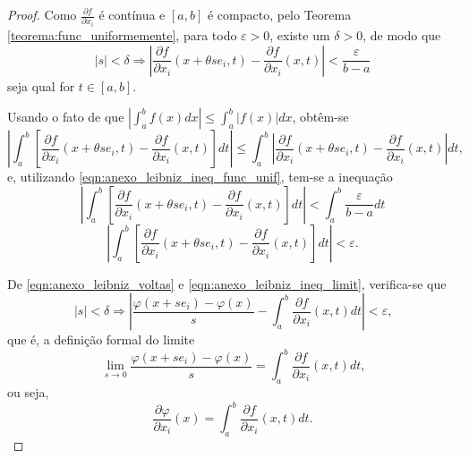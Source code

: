 \begin{apendicesenv}
{\begin{teorema}
\begin{proof}
			Como $\frac{\partial f}{\partial x_i}$ é contínua e $[a,b]$ é compacto, pelo Teorema \ref{teorema:func_uniformemente}, para todo $\varepsilon > 0$, existe um $\delta > 0$, de modo que
			\begin{equation}
				\label{eqn:anexo_leibniz_ineq_func_unif}
				|s|<\delta \Longrightarrow
				\left | 
					\frac{\partial f}{\partial x_i} (x+\theta s e_i, t) - \frac{\partial f}{\partial x_i}(x,t)
				\right | < \frac{\varepsilon}{b-a}
			\end{equation}
			seja qual for $t \in [a,b]$.
			
			Usando o fato de que $|\int_a^b f(x)dx| \leqslant \int_a^b |f(x)| dx$, obtêm-se
			$$
			\left |
				\int_a^b \left [
					\frac{\partial f}{\partial x_i}(x+\theta s e_i, t)-\frac{\partial f}{\partial x_i}(x,t)
				\right ] dt
			\right |
			\leqslant
			\int_a^b\left |
				\frac{\partial f}{\partial x_i}(x+\theta s e_i, t)-\frac{\partial f}{\partial x_i}(x,t)
			\right | dt\text{,}
			$$
			e, utilizando \eqref{eqn:anexo_leibniz_ineq_func_unif}, tem-se a inequação
			$$
			\left |
				\int_a^b \left [
					\frac{\partial f}{\partial x_i}(x+\theta s e_i, t)-\frac{\partial f}{\partial x_i}(x,t)
				\right ] dt
			\right |
			<
			\int_a^b \frac{\varepsilon}{b-a} dt
			$$
			\begin{equation}
				\label{eqn:anexo_leibniz_ineq_limit}
				\left |
					\int_a^b \left [
						\frac{\partial f}{\partial x_i}(x+\theta s e_i, t)-\frac{\partial f}{\partial x_i}(x,t)
					\right ] dt
				\right |
				< \varepsilon \text{.}
			\end{equation}
			
			De \eqref{eqn:anexo_leibniz_voltas} e \eqref{eqn:anexo_leibniz_ineq_limit}, verifica-se que
			$$
				|s|<\delta \Longrightarrow
				\left |
					\frac{\varphi(x+se_i)-\varphi(x)}{s}
					- \int_a^b \frac{\partial f}{\partial x_i}(x,t) dt
				\right |
				< \varepsilon\text{,}
			$$
			que é, a definição formal do limite
			$$
				 \lim_{s\to 0} \frac{\varphi (x+se_i)-\varphi(x)}{s}= \int_a^b \frac{\partial f}{\partial x_i} (x, t)dt \text{,}
			$$
			ou seja,
			$$
				\frac{\partial \varphi}{\partial x_i}(x)=\int _a^b \frac{\partial f}{\partial x_i}(x,t)dt\text{.}
			$$
		\end{proof}
	\end{teorema}
	

}

\end{apendicesenv}